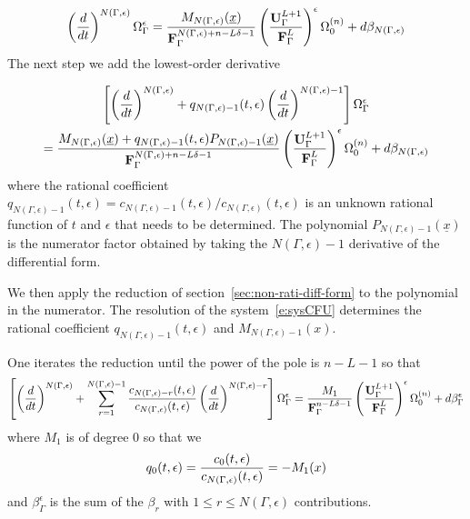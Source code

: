 \documentclass[a4paper,12pt]{article}
\numberwithin{equation}{section}
\numberwithin{figure}{section}
\begin{document}
\begin{equation}\label{e:step1}
\left(d\over dt\right)^{N(\Gamma,\epsilon)} \Omega_\Gamma^\epsilon= {M_{
      N(\Gamma,\epsilon)}(\underline x)\over
    \textbf{F}_\Gamma^{N(\Gamma,\epsilon)+n-L\delta-1}
  }\left(\textbf{U}_\Gamma^{L+1}\over \textbf{F}_\Gamma^L
  \right)^\epsilon \Omega_0^{(n)}+ d\beta_{N(\Gamma,\epsilon)}  
\end{equation}
%
The next step we add the lowest-order derivative

\begin{multline}\label{e:step2}
\left[\left(d\over dt\right)^{N(\Gamma,\epsilon)}
  +q_{N(\Gamma,\epsilon)-1}(t,\epsilon) \left(d\over dt\right)^{N(\Gamma,\epsilon)-1}\right] \Omega_\Gamma^\epsilon\cr= {M_{
      N(\Gamma,\epsilon)}(\underline x)+q_{N(\Gamma,\epsilon)-1}(t,\epsilon)
    P_{N(\Gamma,\epsilon)-1}(\underline x) \over
    \textbf{F}_\Gamma^{N(\Gamma,\epsilon)+n-L\delta-1}
  }\left(\textbf{U}_\Gamma^{L+1}\over \textbf{F}_\Gamma^L
  \right)^\epsilon \Omega_0^{(n)}+ d\beta_{N(\Gamma,\epsilon)}  
\end{multline}
where the rational coefficient
$q_{N(\Gamma,\epsilon)-1}(t,\epsilon)=c_{N(\Gamma,\epsilon)-1}(t,\epsilon)/c_{N(\Gamma,\epsilon)}(t,\epsilon)$
is an unknown rational function of $t$ and $\epsilon$ that needs to be
determined. The polynomial $ P_{N(\Gamma,\epsilon)-1}(\underline x) $
is the numerator factor obtained by taking the $N(\Gamma,\epsilon)-1$
derivative of the differential form.

We then apply the reduction of section~\ref{sec:non-rati-diff-form} to
the polynomial in the numerator. The resolution of the
system~\eqref{e:sysCFU} determines the  rational coefficient
$q_{N(\Gamma,\epsilon)-1}(t,\epsilon)$ and
$M_{N(\Gamma,\epsilon)-1}(x)$.

One iterates the reduction until the power of the pole is $n-L-1$ so
that
\begin{equation}\label{e:stepfinal}
\left[\left(d\over dt\right)^{N(\Gamma,\epsilon)}
  +\sum_{r=1}^{N(\Gamma,\epsilon)-1}
  {c_{N(\Gamma,\epsilon)-r}(t,\epsilon)\over c_{N(\Gamma,\epsilon)}(t,\epsilon)} \left(d\over dt\right)^{N(\Gamma,\epsilon)-r}\right] \Omega_\Gamma^\epsilon= {M_{1}\over
    \textbf{F}_\Gamma^{n-L\delta-1}
  }\left(\textbf{U}_\Gamma^{L+1}\over \textbf{F}_\Gamma^L
  \right)^\epsilon \Omega_0^{(n)}+ d\beta_\Gamma^\epsilon 
\end{equation}
where $M_1$ is of degree 0 so that we
\begin{equation}
  q_0(t,\epsilon)=  {c_{0}(t,\epsilon)\over c_{N(\Gamma,\epsilon)}(t,\epsilon)}= -M_1(x)  
\end{equation}
and $\beta_\Gamma^\epsilon $ is the sum of the $\beta_r$ with $1\leq
r\leq N(\Gamma,\epsilon)$
contributions. 
\end{document}

